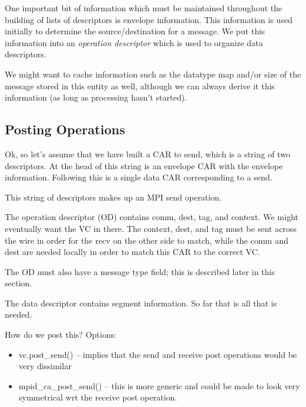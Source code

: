 \documentclass[11pt,letterpaper]{article}
\begin{document}
One important bit of information which must be maintained throughout the
building of lists of descriptors is envelope information.  This information is
used initially to determine the source/destination for a message.  We put this
information into an \emph{operation descriptor} which is used to organize data
descriptors.

We might want to cache information such as the datatype map and/or size of the
message stored in this entity as well, although we can always derive it this
information (as long as processing hasn't started).

\subsection{Posting Operations}


Ok, so let's assume that we have built a CAR to send, which is a string of two
descriptors.  At the head of this string is an envelope CAR with the envelope
information.  Following this is a single data CAR corresponding to a send.

This string of descriptors makes up an MPI send operation.

The operation descriptor (OD) contains comm, dest, tag, and context.  We might
eventually want the VC in there.  The context, dest, and tag must be sent
across the wire in order for the recv on the other side to match, while the
comm and dest are needed locally in order to match this CAR to the correct
VC.

The OD must also have a message type field; this is described later in this
section.


The data descriptor contains segment information.  So far that is all that is
needed.

How do we post this?  Options:
\begin{itemize}
\item vc.post\_send() -- implies that the send and receive post operations would
  be very dissimilar
\item mpid\_ca\_post\_send() -- this is more generic and could be made to look
  very symmetrical wrt the receive post operation.
\end{itemize}
\end{document}
